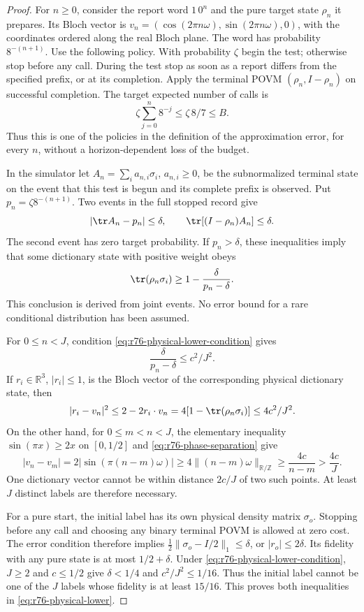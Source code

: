 \begin{proof}
For $n\ge0$, consider the report word $1\,0^n$ and the pure target state
$\rho_n$ it prepares.  Its Bloch vector is
$v_n=(\cos(2\pi n\omega),\sin(2\pi n\omega),0)$, with the coordinates
ordered along the real Bloch plane.  The word has probability
$8^{-(n+1)}$.  Use the following policy.  With probability $\zeta$ begin
the test; otherwise stop before any call.  During the test stop as soon
as a report differs from the specified prefix, or at its completion.
Apply the terminal POVM $(\rho_n,I-\rho_n)$ on successful completion.
The target expected number of calls is
\[
 \zeta\sum_{j=0}^{n}8^{-j}\le\zeta\,8/7\le B.
\]
Thus this is one of the policies in the definition of the approximation
error, for every $n$, without a horizon-dependent loss of the budget.

In the simulator let $A_n=\sum_i a_{n,i}\sigma_i$, $a_{n,i}\ge0$, be
the subnormalized terminal state on the event that this test is begun
and its complete prefix is observed.  Put
$p_n=\zeta 8^{-(n+1)}$.  Two events in the full stopped record give
\begin{equation}\label{eq:r76-prefix-mass-fidelity}
 |\tr A_n-p_n|\le\delta,
 \qquad \tr[(I-\rho_n)A_n]\le\delta.
\end{equation}
The second event has zero target probability.  If $p_n>\delta$, these
inequalities imply that some dictionary state with positive weight obeys
\[
 \tr(\rho_n\sigma_i)
 \ge 1-\frac{\delta}{p_n-\delta}.
\]
This conclusion is derived from joint events.  No error bound for a
rare conditional distribution has been assumed.

For $0\le n<J$, condition \eqref{eq:r76-physical-lower-condition} gives
\[
 \frac{\delta}{p_n-\delta}\le c^2/J^2.
\]
If $r_i\in\mathbb R^3$, $|r_i|\le1$, is the Bloch vector of the
corresponding physical dictionary state, then
\[
 |r_i-v_n|^2
 \le 2-2r_i\mathbin{\cdot}v_n
 =4[1-\tr(\rho_n\sigma_i)]\le4c^2/J^2.
\]
On the other hand, for $0\le m<n<J$, the elementary inequality
$\sin(\pi x)\ge2x$ on $[0,1/2]$ and
\eqref{eq:r76-phase-separation} give
\[
 |v_n-v_m|=2|\sin(\pi(n-m)\omega)|
 \ge4\|(n-m)\omega\|_{\mathbb R/\mathbb Z}
 \ge\frac{4c}{n-m}>\frac{4c}{J}.
\]
One dictionary vector cannot be within distance $2c/J$ of two such
points.  At least $J$ distinct labels are therefore necessary.

For a pure start, the initial label has its own physical density matrix
$\sigma_o$.  Stopping before any call and choosing any binary terminal
POVM is allowed at zero cost.  The error condition therefore implies
$\tfrac12\|\sigma_o-I/2\|_1\le\delta$, or $|r_o|\le2\delta$.
Its fidelity with any pure state is at most $1/2+\delta$.
Under \eqref{eq:r76-physical-lower-condition}, $J\ge2$ and $c\le1/2$
give $\delta<1/4$ and $c^2/J^2\le1/16$.  Thus the initial label cannot
be one of the $J$ labels whose fidelity is at least $15/16$.
This proves both inequalities in \eqref{eq:r76-physical-lower}.


\end{proof}
